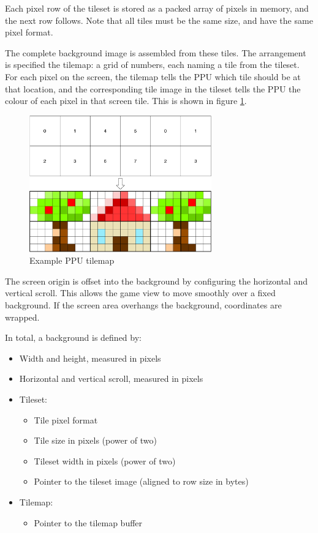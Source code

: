 Each pixel row of the tileset is stored as a packed array of pixels in memory, and the next row follows. Note that all tiles must be the same size, and have the same pixel format.

The complete background image is assembled from these tiles. The arrangement is specified the tilemap: a grid of numbers, each naming a tile from the tileset. For each pixel on the screen, the tilemap tells the PPU which tile should be at that location, and the corresponding tile image in the tileset tells the PPU the colour of each pixel in that screen tile. This is shown in figure \ref{diagram:ppu_tilemap}.

\begin{figure}[H]
\centering
\caption{Example PPU tilemap}
\label{diagram:ppu_tilemap}
\includegraphics[width=0.7\textwidth]{diagrams/ppu_tilemap.pdf}
\end{figure}

The screen origin is offset into the background by configuring the horizontal and vertical scroll. This allows the game view to move smoothly over a fixed background. If the screen area overhangs the background, coordinates are wrapped.

In total, a background is defined by:

\begin{itemize}
	\item Width and height, measured in pixels
	\item Horizontal and vertical scroll, measured in pixels
	\item Tileset:
	\begin{itemize}
		\item Tile pixel format
		\item Tile size in pixels (power of two)
		\item Tileset width in pixels (power of two)
		\item Pointer to the tileset image (aligned to row size in bytes)
	\end{itemize}
	\item Tilemap:
	\begin{itemize}
		\item Pointer to the tilemap buffer
	\end{itemize}
\end{itemize}

